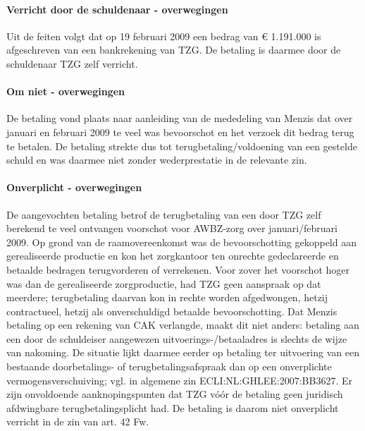 \documentclass[
  dutch,
  a4paper,
]{article}
\begin{document}
\paragraph{Verricht door de schuldenaar - overwegingen}\label{verricht-door-de-schuldenaar---overwegingen-85}

Uit de feiten volgt dat op 19 februari 2009 een bedrag van € 1.191.000 is afgeschreven van een bankrekening van TZG. De betaling is daarmee door de schuldenaar TZG zelf verricht.

\paragraph{Om niet - overwegingen}\label{om-niet---overwegingen-85}

De betaling vond plaats naar aanleiding van de mededeling van Menzis dat over januari en februari 2009 te veel was bevoorschot en het verzoek dit bedrag terug te betalen. De betaling strekte dus tot terugbetaling/voldoening van een gestelde schuld en was daarmee niet zonder wederprestatie in de relevante zin.

\paragraph{Onverplicht - overwegingen}\label{onverplicht---overwegingen-85}

De aangevochten betaling betrof de terugbetaling van een door TZG zelf berekend te veel ontvangen voorschot voor AWBZ-zorg over januari/februari 2009. Op grond van de raamovereenkomst was de bevoorschotting gekoppeld aan gerealiseerde productie en kon het zorgkantoor ten onrechte gedeclareerde en betaalde bedragen terugvorderen of verrekenen. Voor zover het voorschot hoger was dan de gerealiseerde zorgproductie, had TZG geen aanspraak op dat meerdere; terugbetaling daarvan kon in rechte worden afgedwongen, hetzij contractueel, hetzij als onverschuldigd betaalde bevoorschotting. Dat Menzis betaling op een rekening van CAK verlangde, maakt dit niet anders: betaling aan een door de schuldeiser aangewezen uitvoerings-/betaaladres is slechts de wijze van nakoming. De situatie lijkt daarmee eerder op betaling ter uitvoering van een bestaande doorbetalings- of terugbetalingsafspraak dan op een onverplichte vermogensverschuiving; vgl. in algemene zin ECLI:NL:GHLEE:2007:BB3627. Er zijn onvoldoende aanknopingspunten dat TZG vóór de betaling geen juridisch afdwingbare terugbetalingsplicht had. De betaling is daarom niet onverplicht verricht in de zin van art. 42 Fw.
\end{document}
